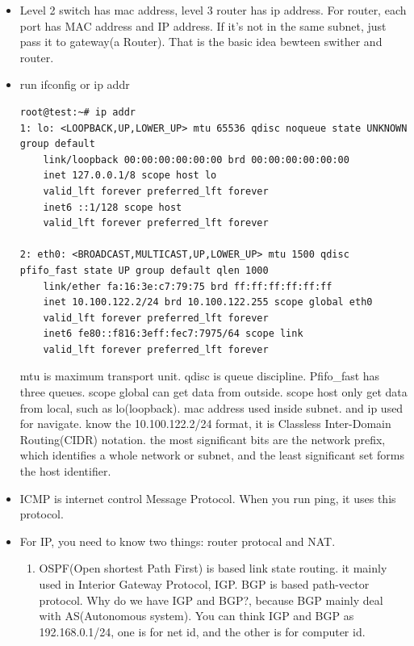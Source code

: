 \documentclass[a4paper,11pt,twoside]{book}
\begin{document}
\begin{itemize}
	\item Level 2 switch has mac address, level 3 router has ip address. For router, each port has MAC address and IP address. If it's not in the same subnet, just pass it to gateway(a Router). That is the basic idea bewteen swither and router. 
	
	\item run ifconfig or ip addr
\begin{lstlisting}
root@test:~# ip addr
1: lo: <LOOPBACK,UP,LOWER_UP> mtu 65536 qdisc noqueue state UNKNOWN group default
	link/loopback 00:00:00:00:00:00 brd 00:00:00:00:00:00
	inet 127.0.0.1/8 scope host lo
	valid_lft forever preferred_lft forever
	inet6 ::1/128 scope host
	valid_lft forever preferred_lft forever

2: eth0: <BROADCAST,MULTICAST,UP,LOWER_UP> mtu 1500 qdisc pfifo_fast state UP group default qlen 1000
	link/ether fa:16:3e:c7:79:75 brd ff:ff:ff:ff:ff:ff
	inet 10.100.122.2/24 brd 10.100.122.255 scope global eth0
	valid_lft forever preferred_lft forever
	inet6 fe80::f816:3eff:fec7:7975/64 scope link
	valid_lft forever preferred_lft forever
\end{lstlisting}
mtu is maximum transport unit. qdisc is queue discipline.  Pfifo\_fast has three queues. scope global can get data from outside. scope host only get data from local, such as lo(loopback).  mac address used inside subnet. and ip used for navigate.  know the 10.100.122.2/24 format, it is Classless Inter-Domain Routing(CIDR) notation. the most significant bits are the network prefix, which identifies a whole network or subnet, and the least significant set forms the host identifier.

\item  ICMP is internet control Message Protocol. When you run ping, it uses this protocol. 

\item  For IP, you need to know two things: router protocal and NAT.
\begin{enumerate}
	\item OSPF(Open shortest Path First) is based link state routing.  it mainly used in Interior Gateway Protocol, IGP.  BGP is based path-vector protocol. Why do we have IGP and BGP?, because BGP mainly deal with AS(Autonomous system). You can think IGP and BGP as 192.168.0.1/24, one is for net id, and the other is for computer id. 
	

\end{enumerate}
\end{itemize}
\end{document}
